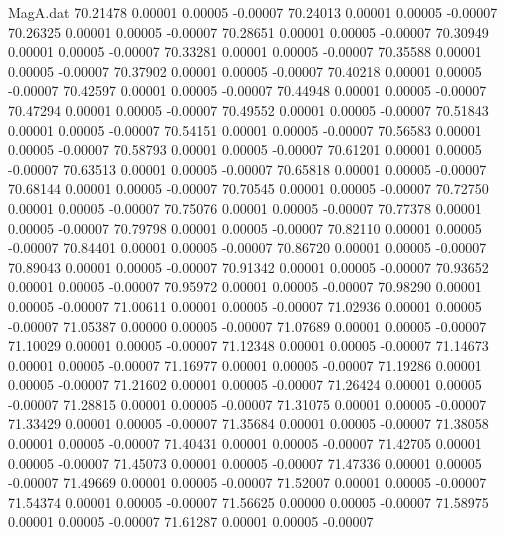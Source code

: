 \begin{filecontents}{MagA.dat}
  70.21478    0.00001    0.00005   -0.00007
  70.24013    0.00001    0.00005   -0.00007
  70.26325    0.00001    0.00005   -0.00007
  70.28651    0.00001    0.00005   -0.00007
  70.30949    0.00001    0.00005   -0.00007
  70.33281    0.00001    0.00005   -0.00007
  70.35588    0.00001    0.00005   -0.00007
  70.37902    0.00001    0.00005   -0.00007
  70.40218    0.00001    0.00005   -0.00007
  70.42597    0.00001    0.00005   -0.00007
  70.44948    0.00001    0.00005   -0.00007
  70.47294    0.00001    0.00005   -0.00007
  70.49552    0.00001    0.00005   -0.00007
  70.51843    0.00001    0.00005   -0.00007
  70.54151    0.00001    0.00005   -0.00007
  70.56583    0.00001    0.00005   -0.00007
  70.58793    0.00001    0.00005   -0.00007
  70.61201    0.00001    0.00005   -0.00007
  70.63513    0.00001    0.00005   -0.00007
  70.65818    0.00001    0.00005   -0.00007
  70.68144    0.00001    0.00005   -0.00007
  70.70545    0.00001    0.00005   -0.00007
  70.72750    0.00001    0.00005   -0.00007
  70.75076    0.00001    0.00005   -0.00007
  70.77378    0.00001    0.00005   -0.00007
  70.79798    0.00001    0.00005   -0.00007
  70.82110    0.00001    0.00005   -0.00007
  70.84401    0.00001    0.00005   -0.00007
  70.86720    0.00001    0.00005   -0.00007
  70.89043    0.00001    0.00005   -0.00007
  70.91342    0.00001    0.00005   -0.00007
  70.93652    0.00001    0.00005   -0.00007
  70.95972    0.00001    0.00005   -0.00007
  70.98290    0.00001    0.00005   -0.00007
  71.00611    0.00001    0.00005   -0.00007
  71.02936    0.00001    0.00005   -0.00007
  71.05387    0.00000    0.00005   -0.00007
  71.07689    0.00001    0.00005   -0.00007
  71.10029    0.00001    0.00005   -0.00007
  71.12348    0.00001    0.00005   -0.00007
  71.14673    0.00001    0.00005   -0.00007
  71.16977    0.00001    0.00005   -0.00007
  71.19286    0.00001    0.00005   -0.00007
  71.21602    0.00001    0.00005   -0.00007
  71.26424    0.00001    0.00005   -0.00007
  71.28815    0.00001    0.00005   -0.00007
  71.31075    0.00001    0.00005   -0.00007
  71.33429    0.00001    0.00005   -0.00007
  71.35684    0.00001    0.00005   -0.00007
  71.38058    0.00001    0.00005   -0.00007
  71.40431    0.00001    0.00005   -0.00007
  71.42705    0.00001    0.00005   -0.00007
  71.45073    0.00001    0.00005   -0.00007
  71.47336    0.00001    0.00005   -0.00007
  71.49669    0.00001    0.00005   -0.00007
  71.52007    0.00001    0.00005   -0.00007
  71.54374    0.00001    0.00005   -0.00007
  71.56625    0.00000    0.00005   -0.00007
  71.58975    0.00001    0.00005   -0.00007
  71.61287    0.00001    0.00005   -0.00007

\end{filecontents}
